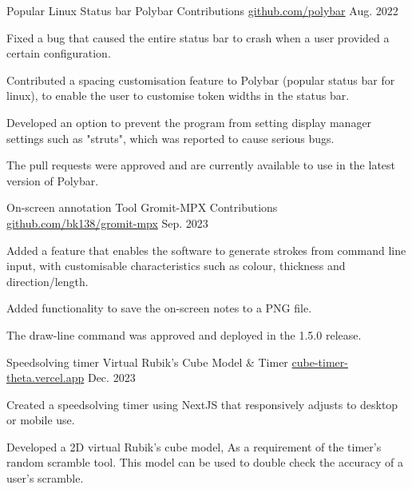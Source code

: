 \begin{cventries}
  \cventry
    {Popular Linux Status bar} %
    {Polybar Contributions} %
    {\href{https://github.com/polybar/polybar}{github.com/polybar}} %
    {Aug. 2022} %
    {
      \begin{cvitems} %
        \item {Fixed a bug that caused the entire status bar to crash when a user provided a certain configuration.}
        \item {Contributed a spacing customisation feature to Polybar (popular status bar for linux), to enable the user to customise token widths in the status bar.}
        \item {Developed an option to prevent the program from setting display manager settings such as "struts", which was reported to cause serious bugs.}
        \item {The pull requests were approved and are currently available to use in the latest version of Polybar.}
      \end{cvitems}
    }

  \cventry
    {On-screen annotation Tool} %
    {Gromit-MPX Contributions} %
    {\href{https://github.com/bk138/gromit-mpx/pull/180}{github.com/bk138/gromit-mpx}} %
    {Sep. 2023} %
    {
      \begin{cvitems} %
        \item {Added a feature that enables the software to generate strokes from command line input, with customisable characteristics such as colour, thickness and direction/length.}
        \item {Added functionality to save the on-screen notes to a PNG file.}
        \item {The draw-line command was approved and deployed in the 1.5.0 release.}
      \end{cvitems}
    }


  \cventry
    {Speedsolving timer} %
    {Virtual Rubik's Cube Model \& Timer} %
    {\href{https://cube-timer-theta.vercel.app/}{cube-timer-theta.vercel.app}} %
    {Dec. 2023} %
    {
      \begin{cvitems} %
        \item {Created a speedsolving timer using NextJS that responsively adjusts to desktop or mobile use.}
        \item {Developed a 2D virtual Rubik's cube model, As a requirement of the timer's random scramble tool. This model can be used to double check the accuracy of a user's scramble. }
      \end{cvitems}
    }

\end{cventries}




